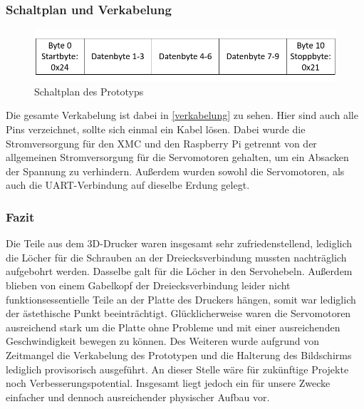 \documentclass[12pt,a4paper,bibliography=totoc,listof=totoc]{scrartcl}
\begin{document}
\subsubsection{Schaltplan und Verkabelung}

\begin{figure}[htbp]
	\centering
	\includegraphics[scale = 0.5]{pics/Schaltplan}
	\caption{Schaltplan des Prototyps}
	\label{fig:verkabelung}
\end{figure}
Die gesamte Verkabelung ist dabei in \ref{verkabelung} zu sehen. Hier sind auch alle Pins verzeichnet, 
sollte sich einmal ein Kabel lösen. Dabei wurde die Stromversorgung für den XMC und den Raspberry Pi getrennt 
von der allgemeinen Stromversorgung für die Servomotoren gehalten, um ein Absacken der Spannung zu verhindern.
Außerdem wurden sowohl die Servomotoren, als auch die UART-Verbindung auf dieselbe Erdung gelegt.

\subsubsection{Fazit}
Die Teile aus dem 3D-Drucker waren insgesamt sehr zufriedenstellend, lediglich die Löcher für die Schrauben 
an der Dreiecksverbindung mussten nachträglich aufgebohrt werden. Dasselbe galt für die Löcher in den Servohebeln. 
Außerdem blieben von einem Gabelkopf der Dreiecksverbindung leider nicht funktionsessentielle Teile an der Platte 
des Druckers hängen, somit war lediglich der ästethische Punkt beeinträchtigt. Glücklicherweise waren die 
Servomotoren ausreichend stark um die Platte ohne Probleme und mit einer ausreichenden Geschwindigkeit bewegen zu 
können. Des Weiteren wurde aufgrund von Zeitmangel die Verkabelung des Prototypen und die Halterung des Bildschirms 
lediglich provisorisch ausgeführt. An dieser Stelle wäre für zukünftige Projekte noch Verbesserungspotential. 
Insgesamt liegt jedoch ein für unsere Zwecke einfacher und dennoch ausreichender physischer Aufbau vor.

\end{document}
